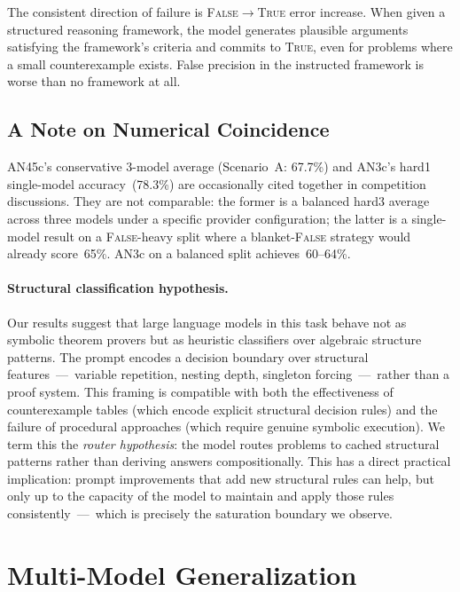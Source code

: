 \documentclass[11pt]{article}
\begin{document}
The consistent direction of failure is \textsc{False}$\to$\textsc{True}
error increase. When given a structured reasoning framework, the model
generates plausible arguments satisfying the framework's criteria and
commits to \textsc{True}, even for problems where a small
counterexample exists. False precision in the instructed framework is
worse than no framework at all.

\subsection{A Note on Numerical Coincidence}

AN45c's conservative 3-model average (Scenario~A: 67.7\%) and AN3c's
hard1 single-model accuracy~(78.3\%) are occasionally cited together in
competition discussions. They are not comparable: the former is a
balanced hard3 average across three models under a specific provider
configuration; the latter is a single-model result on a
\textsc{False}-heavy split where a blanket-\textsc{False} strategy
would already score~65\%. AN3c on a balanced split achieves~60--64\%.

\paragraph{Structural classification hypothesis.}
Our results suggest that large language models in this task behave not
as symbolic theorem provers but as heuristic classifiers over algebraic
structure patterns. The prompt encodes a decision boundary over
structural features~---~variable repetition, nesting depth, singleton
forcing~---~rather than a proof system. This framing is compatible with both the
effectiveness of counterexample tables (which encode explicit structural
decision rules) and the failure of procedural approaches (which require
genuine symbolic execution). We term this the \emph{router hypothesis}:
the model routes problems to cached structural patterns rather than
deriving answers compositionally. This has a direct practical implication:
prompt improvements that add new structural rules can help, but only up
to the capacity of the model to maintain and apply those rules
consistently~---~which is precisely the saturation boundary we observe.

\section{Multi-Model Generalization}
\label{sec:multimodel}
\end{document}
